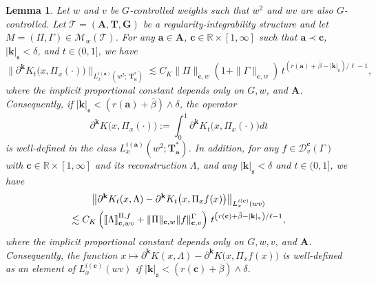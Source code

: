 \documentclass[10pt]{amsart}
\newtheorem{lemm}[theo]{Lemma}
\theoremstyle{definition}
\numberwithin{equation}{section}
\newcommand{\bbR}{\mathbb{R}}
\newcommand{\mfs}{\mathfrak{s}}
\newcommand{\bfa}{\mathbf{a}}
\newcommand{\bfc}{\mathbf{c}}
\newcommand{\bfA}{\mathbf{A}}
\newcommand{\bfT}{\mathbf{T}}
\newcommand{\bfG}{\mathbf{G}}
\newcommand{\bfk}{\mathbf{k}}
\newcommand{\mcD}{\mathcal{D}}
\newcommand{\scT}{\mathscr{T}}
\newcommand{\scM}{\mathscr{M}}
\newcommand{\llbracket}{\mathopen{[\mkern -2.7mu[}}
\newcommand{\rrbracket}{\mathclose{]\mkern -2.7mu]}}
\newcommand{\lb}{\llbracket}
\newcommand{\rb}{\rrbracket}
\begin{document}
\begin{lemm}\label{lem:KregularizePi}
Let $w$ and $v$ be $G$-controlled weights such that $w^2$ and $wv$ are also $G$-controlled. Let $\scT=(\bfA,\bfT,\bfG)$ be a regularity-integrability structure and let $M=(\Pi,\Gamma)\in\scM_w(\scT)$. For any $\bfa\in \bfA$, $\bfc\in\bbR\times[1,\infty]$ such that $\bfa\prec\bfc$, $|{\bfk}|_{\mfs}<\delta$, and $t\in(0,1]$, we have
\[
\big\|\partial^{\bfk}K_t\big(x,{\Pi}_x(\cdot)\big)\big\|_{L_x^{i(\bfa)}\left(w^2;\,\bfT_\bfa^*\right)}\lesssim C_K\|\Pi\|_{\bfc,w}(1+\|\Gamma\|_{\bfc,w})\,t^{\left(r(\bfa)+\bar\beta-|{\bfk}|_{\mfs}\right)/\ell-1},
\]
where the implicit proportional constant depends only on $G,w$, and $\bfA$. Consequently, if $|{\bfk}|_\mfs<(r(\bfa)+\bar\beta)\wedge\delta$, the operator
\[
\partial^{\bfk}K\big(x,\Pi_x(\cdot)\big):=\int_0^1\partial^{\bfk}K_t\big(x,\Pi_x(\cdot)\big)dt
\]
is well-defined in the class $L_x^{i(\bfa)}(w^2;\bfT_\bfa^*)$. In addition, for any $f\in\mcD_{v}^\bfc(\Gamma)$ with $\bfc\in\bbR\times[1,\infty]$ and its reconstruction $\Lambda$, and any $|{\bfk}|_{\mfs}<\delta$ and $t\in(0,1]$, we have
\begin{multline*}
\left\|\partial^{\bfk}K_t(x,\Lambda)-\partial^{\bfk}K_t\big(x,{\Pi}_xf(x)\big)\right\|_{L_x^{i(\bfc)}(wv)}
\\
\lesssim C_K\left(\lb\Lambda\rb_{\bfc,wv}^{\Pi,f}+\|\Pi\|_{\bfc,w}\|f\|_{\bfc,v}^\Gamma\right)\,t^{\left(r(\bfc)+\bar\beta-|{\bfk}|_{\mfs}\right)/\ell-1},
\end{multline*}
where the implicit proportional constant depends only on $G,w,v$, and $\bfA$. Consequently, the function $x\mapsto\partial^{\bfk}K(x,\Lambda)-\partial^{\bfk}K\big(x,{\Pi}_xf(x)\big)$ is well-defined as an element of $L_x^{i(\bfc)}(wv)$ if $|{\bfk}|_\mfs<(r(\bfc)+\bar\beta)\wedge\delta$.
\end{lemm}
\end{document}

